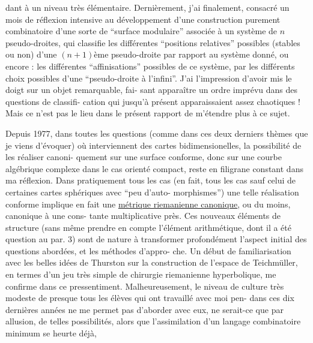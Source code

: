 
dant à un niveau très élémentaire. Dernièrement, j'ai finalement,
consacré un mois de réflexion intensive au développement d'une
construction purement combinatoire d'une sorte de ``surface modulaire''
associée à un système de $n$ pseudo-droites, qui classifie les
différentes ``positions relatives'' possibles (stables ou non) d'une
$(n+1)$ème pseudo-droite par rapport au système donné, ou encore :
les différentes ``affinisations'' possibles de ce système, par les
différents choix possibles d'une ``pseudo-droite à l'infini''. J'ai
l'impression d'avoir mis le doigt sur un objet remarquable, fai-%
sant apparaître un ordre imprévu dans des questions de classifi-%
cation qui jusqu'à présent apparaissaient assez chaotiques !
Mais ce n'est pas le lieu dans le présent rapport de m'étendre plus
à ce sujet.

Depuis 1977, dans toutes les questions (comme dans ces
deux derniers thèmes que je viens d'évoquer) où interviennent des
cartes bidimensionelles, la possibilité de les réaliser canoni-%
quement sur une surface conforme, donc sur une courbe algébrique
complexe dans le cas orienté compact, reste en filigrane constant
dans ma réflexion. Dans pratiquement tous les cas (en fait, tous
les cas sauf celui de certaines cartes sphériques avec ``peu d'auto-%
morphismes'') une telle réalisation conforme implique en fait une
\uline{métrique riemanienne canonique}, ou du moins, canonique à une cons-%
tante multiplicative près. Ces nouveaux éléments de structure
(sans même prendre en compte l'élément arithmétique, dont il a
été question au par. 3) sont de nature à transformer profondément
l'aspect initial des questions abordées, et les méthodes d'appro-%
che. Un début de familiarisation avec les belles idées de Thurston
sur la construction de l'espace de Teichmüller, en termes d'un jeu
très simple de chirurgie riemanienne hyperbolique, me confirme
dans ce pressentiment. Malheureusement, le niveau de culture très
modeste de presque tous les élèves qui ont travaillé avec moi pen-%
dans ces dix dernières années ne me permet pas d'aborder avec eux,
ne serait-ce que par allusion, de telles possibilités, alors que
l'assimilation d'un langage combinatoire minimum se heurte déjà,

